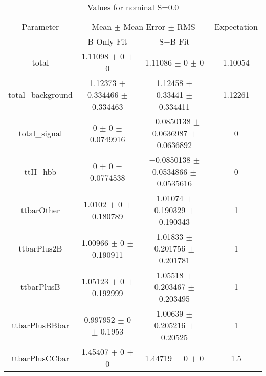 \begin{table}
\centering
\caption{Values for nominal S=0.0}
\begin{tabular}{cccc}
\toprule
Parameter & \multicolumn{2}{c}{Mean $\pm$ Mean Error $\pm$ RMS} & Expectation\\
 & B-Only Fit & S+B Fit & \\
\midrule
total & \num{1.11098} $\pm$ \num{0} $\pm$ \num{0} & \num{1.11086} $\pm$ \num{0} $\pm$ \num{0} & \num{1.10054}\\
total\_background & \num{1.12373} $\pm$ \num{0.334466} $\pm$ \num{0.334463} & \num{1.12458} $\pm$ \num{0.33441} $\pm$ \num{0.334411} & \num{1.12261}\\
total\_signal & \num{0} $\pm$ \num{0} $\pm$ \num{0.0749916} & \num{-0.0850138} $\pm$ \num{0.0636987} $\pm$ \num{0.0636892} & \num{0}\\
ttH\_hbb & \num{0} $\pm$ \num{0} $\pm$ \num{0.0774538} & \num{-0.0850138} $\pm$ \num{0.0534866} $\pm$ \num{0.0535616} & \num{0}\\
ttbarOther & \num{1.0102} $\pm$ \num{0} $\pm$ \num{0.180789} & \num{1.01074} $\pm$ \num{0.190329} $\pm$ \num{0.190343} & \num{1}\\
ttbarPlus2B & \num{1.00966} $\pm$ \num{0} $\pm$ \num{0.190911} & \num{1.01833} $\pm$ \num{0.201756} $\pm$ \num{0.201781} & \num{1}\\
ttbarPlusB & \num{1.05123} $\pm$ \num{0} $\pm$ \num{0.192999} & \num{1.05518} $\pm$ \num{0.203467} $\pm$ \num{0.203495} & \num{1}\\
ttbarPlusBBbar & \num{0.997952} $\pm$ \num{0} $\pm$ \num{0.1953} & \num{1.00639} $\pm$ \num{0.205216} $\pm$ \num{0.20525} & \num{1}\\
ttbarPlusCCbar & \num{1.45407} $\pm$ \num{0} $\pm$ \num{0} & \num{1.44719} $\pm$ \num{0} $\pm$ \num{0} & \num{1.5}\\
\bottomrule
\end{tabular}
\end{table}